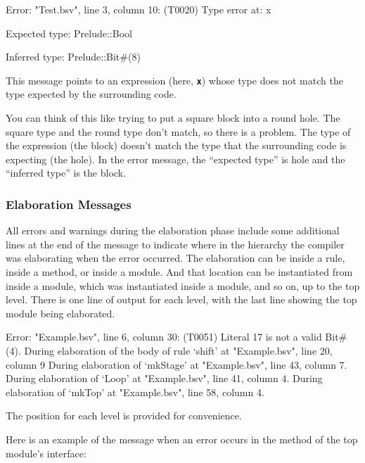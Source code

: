 \documentclass{article}
\newenvironment{centerboxverbatim}
  {\center
   \boxedverbatim}
  {\endboxedverbatim
  {\endcenter }}
\begin{document}
\begin{centerboxverbatim}
Error: "Test.bsv", line 3, column 10: (T0020)
  Type error at:
  x

  Expected type:
  Prelude::Bool

  Inferred type:
  Prelude::Bit#(8)
\end{centerboxverbatim}

This message points to an expression (here, {\bf\tt x}) whose type
does not match the type expected by the surrounding code.

You can think of this like trying to put a square block into a round
hole.  The square type and the round type don't match, so there is a
problem.  The type of the expression (the block) doesn't match the
type that the surrounding code is expecting (the hole).  In the
error message, the ``expected type'' is hole and the ``inferred type''
is the block.


\subsubsection{Elaboration Messages}
\label{elab-msgs}

All errors and warnings during the elaboration phase include some
additional lines at the end of the message to indicate where in the
hierarchy the compiler was elaborating when the error occurred.  The
elaboration can be inside a rule, inside a method, or inside a
module.  And that location can be instantiated from inside a module,
which was instantiated inside a module, and so on,  up to the top level. 
There is one line of output for each level, with the last line showing
the top module being elaborated.  

\begin{centerboxverbatim}
Error: "Example.bsv", line 6, column 30: (T0051)
 Literal 17 is not a valid Bit#(4).
 During elaboration of the body of rule `shift' at "Example.bsv", line 20,
 column 9
 During elaboration of `mkStage' at "Example.bsv", line 43, column 7.
 During elaboration of `Loop' at "Example.bsv", line 41, column 4.
 During elaboration of `mkTop' at "Example.bsv", line 58, column 4.
\end{centerboxverbatim}

The position for each level is provided for convenience.

Here is an  example of  the message when an error occurs in the method of the top
module's interface:
\end{document}
